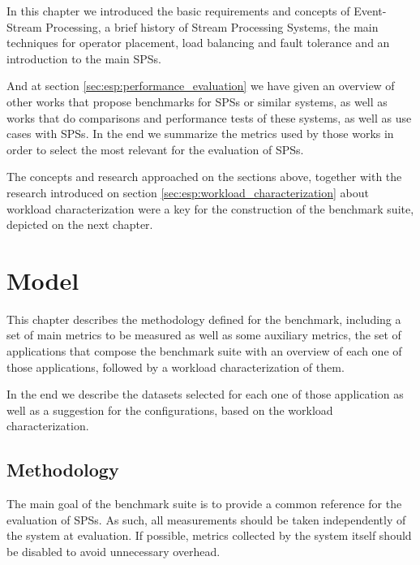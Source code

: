 \documentclass[ppgc,diss,english]{iiufrgs}
\begin{document}
In this chapter we introduced the basic requirements and concepts of Event-Stream Processing, a brief history of Stream Processing Systems, the main techniques for operator placement, load balancing and fault tolerance and an introduction to the main SPSs.

And at section \ref{sec:esp:performance_evaluation} we have given an overview of other works that propose benchmarks for SPSs or similar systems, as well as works that do comparisons and performance tests of these systems, as well as use cases with SPSs. In the end we summarize the metrics used by those works in order to select the most relevant for the evaluation of SPSs.

The concepts and research approached on the sections above, together with the research introduced on section \ref{sec:esp:workload_characterization} about workload characterization were a key for the construction of the benchmark suite, depicted on the next chapter.

\chapter{Model}
\label{chapter:model}

This chapter describes the methodology defined for the benchmark, including a set of main metrics to be measured as well as some auxiliary metrics, the set of applications that compose the benchmark suite with an overview of each one of those applications, followed by a workload characterization of them.

In the end we describe the datasets selected for each one of those application as well as a suggestion for the configurations, based on the workload characterization.

\section{Methodology}
\label{sec:methodology}

%
%
%

The main goal of the benchmark suite is to provide a common reference for the evaluation of SPSs. As such, all measurements should be taken independently of the system at evaluation. If possible, metrics collected by the system itself should be disabled to avoid unnecessary overhead.
\end{document}
